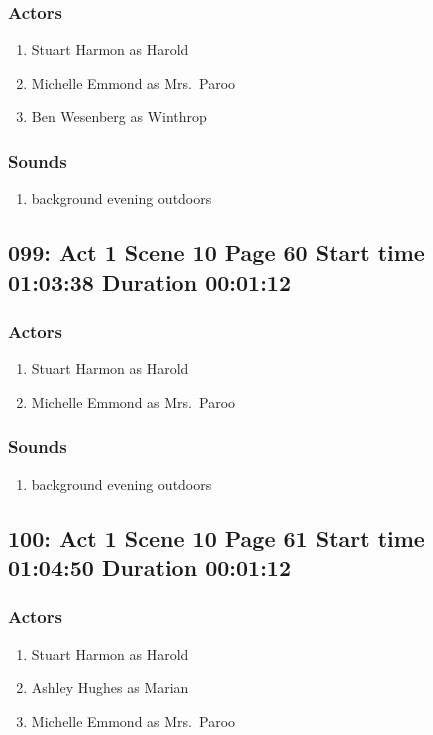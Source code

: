 \subsubsection{Actors}
\begin{enumerate}
\item Stuart Harmon as Harold
\item Michelle Emmond as Mrs.~Paroo
\item Ben Wesenberg as Winthrop
\end{enumerate}

\subsubsection{Sounds}
\begin{enumerate}
\item background evening outdoors
\end{enumerate}
\subsection{099: Act 1 Scene 10 Page 60 Start time 01:03:38 Duration 00:01:12}

\subsubsection{Actors}
\begin{enumerate}
\item Stuart Harmon as Harold
\item Michelle Emmond as Mrs.~Paroo
\end{enumerate}

\subsubsection{Sounds}
\begin{enumerate}
\item background evening outdoors
\end{enumerate}
\subsection{100: Act 1 Scene 10 Page 61 Start time 01:04:50 Duration 00:01:12}

\subsubsection{Actors}
\begin{enumerate}
\item Stuart Harmon as Harold
\item Ashley Hughes as Marian
\item Michelle Emmond as Mrs.~Paroo
\end{enumerate}

